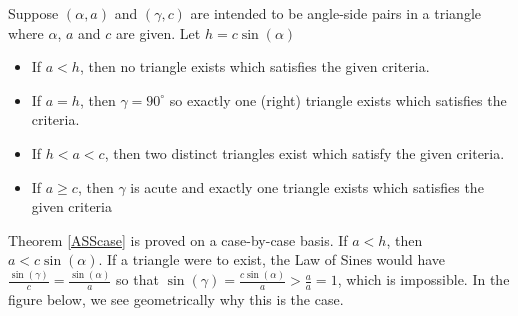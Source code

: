 \smallskip

\colorbox{ResultColor}{\bbm

\begin{thm} \label{ASScase}  Suppose $(\alpha,a)$ and $(\gamma, c)$ are intended to be angle-side pairs in a triangle where $\alpha$, $a$ and $c$ are given.  Let $h = c\sin(\alpha)$

\begin{itemize}

\item  If $a < h$, then no triangle exists which satisfies the given criteria.

\item  If $a = h$, then $\gamma = 90^{\circ}$ so exactly one (right) triangle exists which satisfies the criteria.

\item  If $h < a < c$, then two distinct triangles exist which satisfy the given criteria.

\item  If $a \geq c$, then $\gamma$ is acute and exactly one triangle exists which satisfies the given criteria

\end{itemize}

\end{thm}

\ebm}

\smallskip

Theorem \ref{ASScase} is proved on a case-by-case basis.   If $a < h$, then $a < c\sin(\alpha)$.  If a triangle were to exist, the Law of Sines would have $\frac{\sin(\gamma)}{c} = \frac{\sin(\alpha)}{a}$ so that $\sin(\gamma) = \frac{c \sin(\alpha)}{a} > \frac{a}{a} =  1$, which is impossible. In the figure below, we see geometrically why this is the case.

